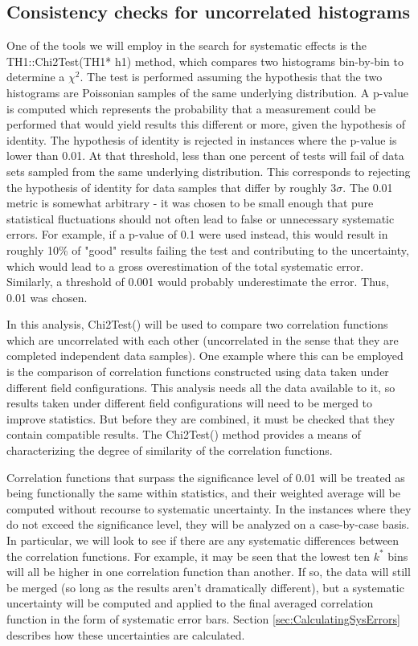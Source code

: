 \subsection{Consistency checks for uncorrelated histograms}
\label{sec:ConsistencyCheckUncorrelated}
One of the tools we will employ in the search for systematic effects is the TH1::Chi2Test(TH1* h1) method, which compares two histograms bin-by-bin to determine a $\chi^2$.  The test is performed assuming the hypothesis that the two histograms are Poissonian samples of the same underlying distribution.  A p-value is computed which represents the probability that a measurement could be performed that would yield results this different or more, given the hypothesis of identity.  The hypothesis of identity is rejected in instances where the p-value is lower than 0.01. At that threshold, less than one percent of tests will fail of data sets sampled from the same underlying distribution.  This corresponds to rejecting the hypothesis of identity for data samples that differ by roughly $3 \sigma$.  The 0.01 metric is somewhat arbitrary - it was chosen to be small enough that pure statistical fluctuations should not often lead to false or unnecessary systematic errors.  For example, if a p-value of 0.1 were used instead, this would result in roughly 10\% of "good" results failing the test and contributing to the uncertainty, which would lead to a gross overestimation of the total systematic error.  Similarly, a threshold of 0.001 would probably underestimate the error.  Thus, 0.01 was chosen.

In this analysis, Chi2Test() will be used to compare two correlation functions which are uncorrelated with each other (uncorrelated in the sense that they are completed independent data samples).  One example where this can be employed is the comparison of correlation functions constructed using data taken under different field configurations.  This analysis needs all the data available to it, so results taken under different field configurations will need to be merged to improve statistics.  But before they are combined, it must be checked that they contain compatible results.  The Chi2Test() method provides a means of characterizing the degree of similarity of the correlation functions.  

Correlation functions that surpass the significance level of 0.01 will be treated as being functionally the same within statistics, and their weighted average will be computed without recourse to systematic uncertainty. In the instances where they do not exceed the significance level, they will be analyzed on a case-by-case basis.  In particular, we will look to see if there are any systematic differences between the correlation functions.  For example, it may be seen that the lowest ten $k^*$ bins will all be higher in one correlation function than another.  If so, the data will still be merged (so long as the results aren't dramatically different), but a systematic uncertainty will be computed and applied to the final averaged correlation function in the form of systematic error bars.  Section \ref{sec:CalculatingSysErrors} describes how these uncertainties are calculated.  

